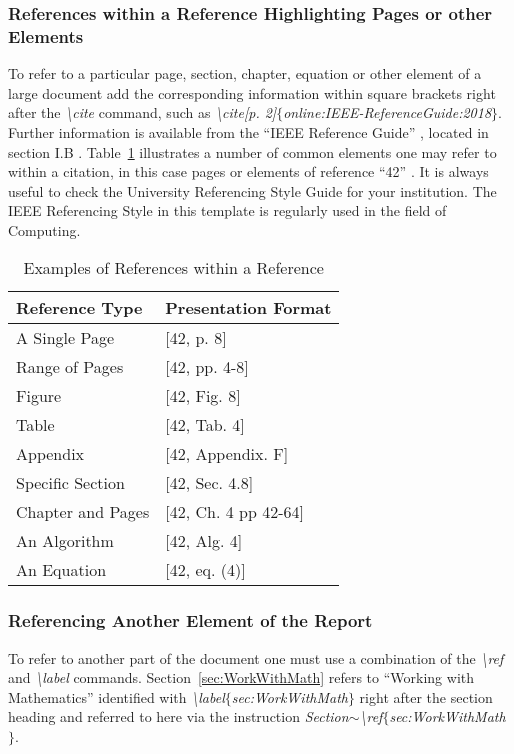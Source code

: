 \subsubsection{References within a Reference Highlighting Pages or other Elements}
To refer to a particular page, section, chapter, equation or other element of a large document add the corresponding information within square brackets right after the \emph{\textbackslash cite} command, such as \emph{\textbackslash cite[p. 2]$\{$online:IEEE-ReferenceGuide:2018$\}$}. Further information is available from the ``IEEE Reference Guide'' \cite[p.3]{online:IEEE-ReferenceGuide:2018}, located in section I.B \cite[Sec I.B]{online:IEEE-ReferenceGuide:2018}. Table~\ref{tab:ReferenceExamples} illustrates a number of common elements one may refer to within a citation, in this case pages or elements of reference ``42'' \cite[Ch. 27]{book:Adams:1979}. It is always useful to check the University Referencing Style Guide for your institution. The IEEE Referencing Style in this template is regularly used in the field of Computing.   

\begin{table}[H]
\caption{Examples of References within a Reference}\label{tab:ReferenceExamples}
\centering
\small
\begin{tabular}{ll}
\toprule \textbf{Reference Type}& \textbf{Presentation Format}\\
\midrule
A Single Page & [42, p. 8] \\
Range of Pages & [42, pp. 4-8] \\
Figure & [42, Fig. 8] \\
Table & [42, Tab. 4] \\
Appendix & [42, Appendix. F] \\
Specific Section & [42, Sec. 4.8] \\
Chapter and Pages & [42, Ch. 4 pp 42-64] \\
An Algorithm & [42, Alg. 4] \\
An Equation & [42, eq. (4)] \\
\bottomrule
\end{tabular}
\end{table}


 

\subsubsection{Referencing Another Element of the Report}
To refer to another part of the document one must use a combination of the \emph{\textbackslash ref} and \emph{\textbackslash label} commands. Section~\ref{sec:WorkWithMath} refers to ``Working with Mathematics'' identified with \emph{\textbackslash label$\{$sec:WorkWithMath$\}$} right after the section heading and referred to here via the instruction \emph{Section$\sim$\textbackslash ref$\{$sec:WorkWithMath$\}$}. 

